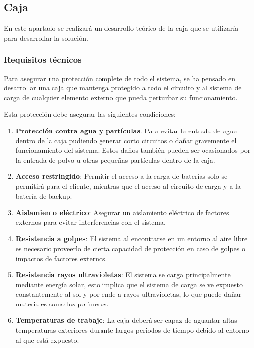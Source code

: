 
\subsection{Caja}

En este apartado se realizará un desarrollo teórico de la caja que se utilizaría para desarrollar la solución.

\subsubsection{Requisitos técnicos}

Para asegurar una protección complete de todo el sistema, se ha pensado en desarrollar una caja que mantenga protegido a todo el circuito y al sistema de carga de cualquier elemento externo que pueda perturbar su funcionamiento.

Esta protección debe asegurar las siguientes condiciones:
\begin{enumerate}
    \item \textbf{Protección contra agua y partículas}: Para evitar la entrada de agua dentro de la caja pudiendo generar corto circuitos o dañar gravemente el funcionamiento del sistema. Estos daños también pueden ser ocasionados por la entrada de polvo u otras pequeñas partículas dentro de la caja. 
    \item \textbf{Acceso restringido}: Permitir el acceso a la carga de baterías solo se permitirá para el cliente, mientras que el acceso al circuito de carga y a la batería de backup. 
    \item \textbf{Aislamiento eléctrico}: Asegurar un aislamiento eléctrico de factores externos para evitar interferencias con el sistema.
    \item \textbf{Resistencia a golpes}: El sistema al encontrarse en un entorno al aire libre es necesario proveerlo de cierta capacidad de protección en caso de golpes o impactos de factores externos.
    \item \textbf{Resistencia rayos ultravioletas}: El sistema se carga principalmente mediante energía solar, esto implica que el sistema de carga se ve expuesto constantemente al sol y por ende a rayos ultravioletas, lo que puede dañar materiales como los polímeros.
    \item \textbf{Temperaturas de trabajo}: La caja deberá ser capaz de aguantar altas temperaturas exteriores durante largos periodos de tiempo debido al entorno al que está expuesto.
\end{enumerate}

